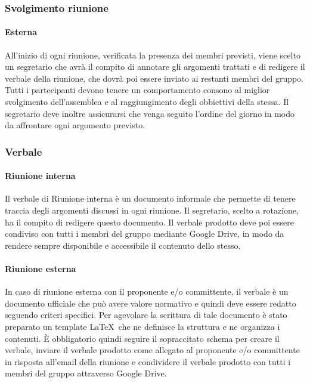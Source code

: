 \documentclass[../NormeDiProgetto.tex]{subfiles}
\begin{document}
				\subsubsection{Svolgimento riunione}
					\paragraph{Esterna\\}
						All'inizio di ogni riunione, verificata la presenza dei membri previsti, viene scelto un segretario che avrà il compito di annotare gli argomenti trattati e di redigere il verbale della riunione, che dovrà poi essere inviato ai restanti membri del gruppo. 
						Tutti i partecipanti devono tenere un comportamento consono al miglior svolgimento dell'assemblea e al raggiungimento degli obbiettivi della stessa. Il segretario deve inoltre assicurarsi che venga seguito l'ordine del giorno in modo da affrontare ogni argomento previsto.
				\subsubsection{Verbale}
					\paragraph{Riunione interna\\}
						Il verbale di Riunione interna è un documento informale che permette di tenere traccia degli argomenti discussi in ogni riunione. Il segretario, scelto a rotazione, ha il compito di redigere questo documento. Il verbale prodotto deve poi essere condiviso con tutti i membri del gruppo mediante Google Drive, in modo da rendere sempre disponibile e accessibile il contenuto dello stesso.
					\paragraph{Riunione esterna\\}
						In caso di riunione esterna con il proponente e/o committente, il verbale è un documento ufficiale che può avere valore normativo e quindi deve essere redatto seguendo criteri specifici.
						Per agevolare la scrittura di tale documento è stato preparato un template \LaTeX\ che ne definisce la struttura e ne organizza i contenuti. È obbligatorio quindi seguire il sopraccitato schema per creare il verbale, inviare il verbale prodotto come allegato al proponente e/o committente in risposta all'email della riunione e condividere il 
						verbale prodotto con tutti i membri del gruppo attraverso Google Drive.
\end{document}
